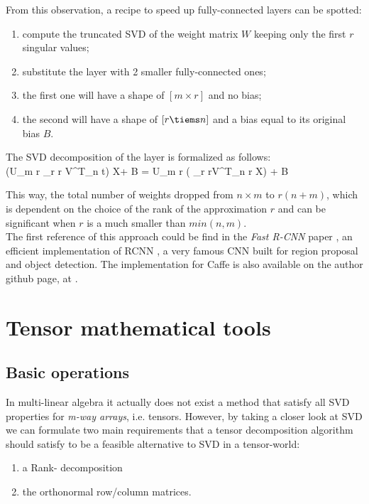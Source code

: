 From this observation, a recipe to speed up fully-connected layers can be spotted: 
\begin{enumerate}
	\item compute the truncated SVD of the weight matrix $W$ keeping only the first $\mathit{r}$ singular values; 
	\item substitute the layer with 2 smaller fully-connected ones; 
	\item the first one will have a shape of $[m \times r]$ and no bias; 
	\item the second will have a shape of $[ r \tiems n]$ and a bias equal to its original bias $B$.   
\end{enumerate}

The SVD decomposition of the layer is formalized as follows: 
\begin{equation}

\end{equation}
(U_{m \times r} \Sigma_{r \times r} V^T_{n \times t}) X+ B = U_{m \times r} ( \Sigma_{r \times r}V^T_{n \times r} X) + B 

This way, the total number of weights dropped from $n \times m$ to $r(n+m)$, which is dependent on the choice of the rank of the approximation $r$ and can be significant when $r$ is a much smaller than $min(n, m)$.\\
The first reference of this approach could be find in the \emph{Fast R-CNN} paper , an efficient implementation of RCNN \parencite{rcnn}, a very famous CNN built for region proposal and object detection. The implementation for Caffe is also available on the author github page, at \parencite{Wgithub-rcnn}.
\section{Tensor mathematical tools}
\label{sec:tensor-math}

\subsection{Basic operations}
In multi-linear algebra it actually does not exist a method that satisfy all SVD properties for \emph{m-way arrays}, i.e. tensors. However, by taking a closer look at SVD we can formulate two main requirements that a tensor decomposition algorithm should satisfy to be a feasible alternative to SVD in a tensor-world: 
{\begin{enumerate}
	\item a Rank- decomposition
	\item the orthonormal row/column matrices.
\end{enumerate}}


